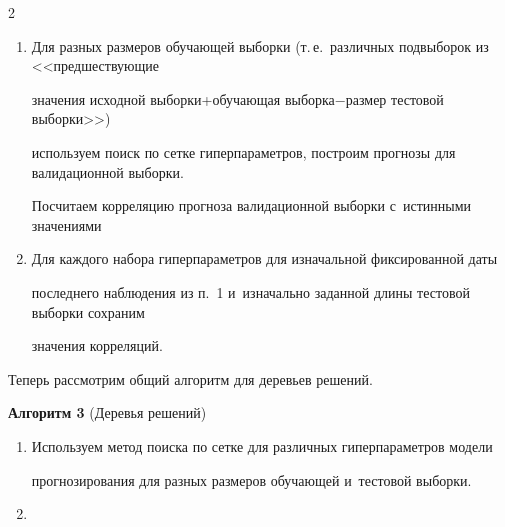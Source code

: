 \begin{multicols}{2}
\begin{enumerate}[1.]
        значениями из исходной выборки

        

        \item

        Для разных размеров обучающей выборки (т.\,е.\ различных подвыборок из <<пред\-шест\-ву\-ющие 

        значения исходной вы\-бор\-ки\;+\;обуча\-ющая вы\-бор\-ка\;$-$\;раз\-мер тес\-то\-вой выборки>>) 

        используем поиск по сетке гиперпараметров, построим прогнозы для валидационной выборки. 

        Посчитаем корреляцию прогноза валидационной выборки с~истинными значениями

        

        \item

        Для каждого набора гиперпараметров для изначальной фиксированной даты 

        последнего наблюдения из п.~1 и~изначально заданной длины тестовой выборки сохраним 

        значения корреляций.

        



    \end{enumerate}





Теперь рассмотрим общий алгоритм для де\-ревь\-ев решений.



\vspace*{2pt}



\textbf{Алгоритм 3} (Деревья решений)



    \noindent

    \begin{enumerate}[1.]

    



        \item Используем метод поиска по сетке для различных гиперпараметров модели 

        прогнозирования для разных размеров обучающей и~тес\-то\-вой выборки.



        

        \item




\end{enumerate}
\end{multicols}

